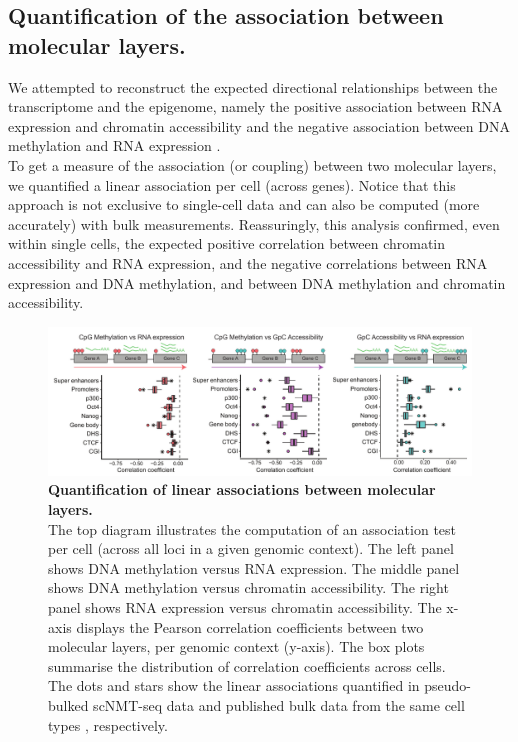 \subsection{Quantification of the association between molecular layers.}

We attempted to reconstruct the expected directional relationships between the transcriptome and the epigenome, namely the positive association between RNA expression and chromatin accessibility and the negative association between DNA methylation and RNA expression \cite{Thurman2012,Angermueller2016}.\\
To get a measure of the association (or coupling) between two molecular layers, we quantified a linear association per cell (across genes). Notice that this approach is not exclusive to single-cell data and can also be computed (more accurately) with bulk measurements. Reassuringly, this analysis confirmed, even within single cells, the expected positive correlation between chromatin accessibility and RNA expression, and the negative correlations between RNA expression and DNA methylation, and between DNA methylation and chromatin accessibility.

\begin{figure}[H]
	\centering
	\includegraphics[width=1.0\linewidth]{scNMT_correlations_acrossgenes}
	\caption[]{\textbf{Quantification of linear associations between molecular layers.}\\
	The top diagram illustrates the computation of an association test per cell (across all loci in a given genomic context). The left panel shows DNA methylation versus RNA expression. The middle panel shows DNA methylation versus chromatin accessibility. The right panel shows RNA expression versus chromatin accessibility. The x-axis displays the Pearson correlation coefficients between two molecular layers, per genomic context (y-axis). The box plots summarise the distribution of correlation coefficients across cells. The dots and stars show the linear associations quantified in pseudo-bulked scNMT-seq data and published bulk data from the same cell types \cite{Ficz2013,ENCODE2012}, respectively. }
	\label{fig:scNMT_correlations_acrossgenes}
\end{figure}

